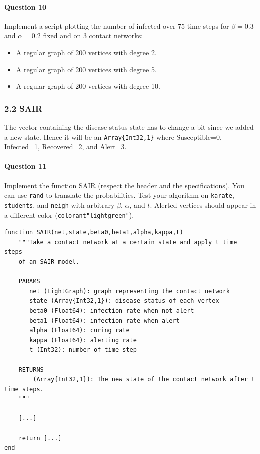 \documentclass{article}
\begin{document}
\paragraph{Question 10} Implement a script plotting the number of infected over 75 time steps for $\beta=0.3$ and $\alpha=0.2$ fixed and on 3 contact networks:

\begin{itemize}
    \item A regular graph of 200 vertices with degree 2.
    \item A regular graph of 200 vertices with degree 5.
    \item A regular graph of 200 vertices with degree 10.
\end{itemize}

\subsubsection*{2.2 SAIR}

The vector containing the disease status state has to change a bit since we added a new state. Hence it will be an \texttt{Array\{Int32,1\}} where Susceptible=0, Infected=1, Recovered=2, and Alert=3.

\paragraph{Question 11} Implement the function SAIR (respect the header and the specifications). You can use \texttt{rand} to translate the probabilities. Test your algorithm on \texttt{karate}, \texttt{students}, and \texttt{neigh} with arbitrary $\beta$, $\alpha$, and $t$. Alerted vertices should appear in a different color (\texttt{colorant"lightgreen"}).

\begin{verbatim}
function SAIR(net,state,beta0,beta1,alpha,kappa,t)
    """Take a contact network at a certain state and apply t time steps
    of an SAIR model.
    
    PARAMS
       net (LightGraph): graph representing the contact network
       state (Array{Int32,1}): disease status of each vertex
       beta0 (Float64): infection rate when not alert
       beta1 (Float64): infection rate when alert
       alpha (Float64): curing rate
       kappa (Float64): alerting rate
       t (Int32): number of time step
    
    RETURNS
        (Array{Int32,1}): The new state of the contact network after t time steps.
    """ 

    [...]     

    return [...]
end
\end{verbatim}
\end{document}

